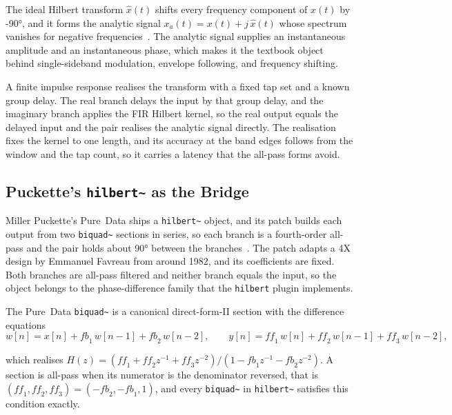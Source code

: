 \documentclass[11pt,a4paper]{article}
\begin{document}
The ideal Hilbert transform $\hat{x}(t)$ shifts every frequency component of $x(t)$ by \ang{-90}, and it forms the analytic signal $x_a(t) = x(t) + j\,\hat{x}(t)$ whose spectrum vanishes for negative frequencies~\cite{Bracewell2000,OppenheimSchafer2010}.
The analytic signal supplies an instantaneous amplitude and an instantaneous phase, which makes it the textbook object behind single-sideband modulation, envelope following, and frequency shifting.

A finite impulse response realises the transform with a fixed tap set and a known group delay.
The real branch delays the input by that group delay, and the imaginary branch applies the FIR Hilbert kernel, so the real output equals the delayed input and the pair realises the analytic signal directly.
The realisation fixes the kernel to one length, and its accuracy at the band edges follows from the window and the tap count, so it carries a latency that the all-pass forms avoid.

\subsection{Puckette's \texttt{hilbert\textasciitilde} as the Bridge}

Miller Puckette's Pure~Data ships a \texttt{hilbert\textasciitilde} object, and its patch builds each output from two \texttt{biquad\textasciitilde} sections in series, so each branch is a fourth-order all-pass and the pair holds about \ang{90} between the branches~\cite{Puckette2007}.
The patch adapts a 4X design by Emmanuel Favreau from around 1982, and its coefficients are fixed.
Both branches are all-pass filtered and neither branch equals the input, so the object belongs to the phase-difference family that the \texttt{hilbert} plugin implements.

The Pure~Data \texttt{biquad\textasciitilde} is a canonical direct-form-II section with the difference equations
\begin{equation}
w[n] = x[n] + \mathit{fb}_1\,w[n-1] + \mathit{fb}_2\,w[n-2],
\qquad
y[n] = \mathit{ff}_1\,w[n] + \mathit{ff}_2\,w[n-1] + \mathit{ff}_3\,w[n-2],
\end{equation}

which realises $H(z) = (\mathit{ff}_1 + \mathit{ff}_2 z^{-1} + \mathit{ff}_3 z^{-2})/(1 - \mathit{fb}_1 z^{-1} - \mathit{fb}_2 z^{-2})$.
A section is all-pass when its numerator is the denominator reversed, that is $(\mathit{ff}_1, \mathit{ff}_2, \mathit{ff}_3) = (-\mathit{fb}_2, -\mathit{fb}_1, 1)$, and every \texttt{biquad\textasciitilde} in \texttt{hilbert\textasciitilde} satisfies this condition exactly.
\end{document}
